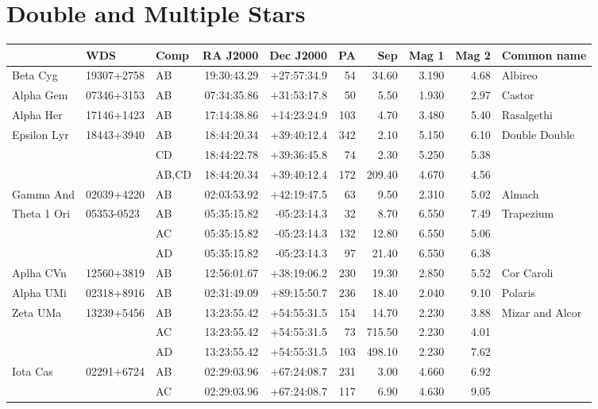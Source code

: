 \documentclass[11pt]{article}
\begin{document}
\section*{Double and Multiple Stars}

\begin{longtable}{lllrrrrrrl}
  \toprule
               & WDS        & Comp  & RA J2000    & Dec J2000   & PA  & Sep    & Mag 1 & Mag 2 & Common name \\
  \midrule \endhead
  Beta Cyg     & 19307+2758 & AB    & 19:30:43.29 & +27:57:34.9 & 54  & 34.60  & 3.190 & 4.68  & Albireo \\[1.5ex]
  Alpha Gem    & 07346+3153 & AB    & 07:34:35.86 & +31:53:17.8 & 50  & 5.50   & 1.930 & 2.97  & Castor \\[1.5ex]
  Alpha Her    & 17146+1423 & AB    & 17:14:38.86 & +14:23:24.9 & 103 & 4.70   & 3.480 & 5.40  & Rasalgethi \\[1.5ex]
  Epsilon Lyr  & 18443+3940 & AB    & 18:44:20.34 & +39:40:12.4 & 342 & 2.10   & 5.150 & 6.10  & Double Double \\
               &            & CD    & 18:44:22.78 & +39:36:45.8 & 74  & 2.30   & 5.250 & 5.38 \\
               &            & AB,CD & 18:44:20.34 & +39:40:12.4 & 172 & 209.40 & 4.670 & 4.56 \\[1.5ex]
  Gamma And    & 02039+4220 & AB    & 02:03:53.92 & +42:19:47.5 & 63  & 9.50   & 2.310 & 5.02  & Almach \\[1.5ex]
  Theta 1 Ori  & 05353-0523 & AB    & 05:35:15.82 & -05:23:14.3 & 32  & 8.70   & 6.550 & 7.49  & Trapezium \\
               &            & AC    & 05:35:15.82 & -05:23:14.3 & 132 & 12.80  & 6.550 & 5.06 \\
               &            & AD    & 05:35:15.82 & -05:23:14.3 & 97  & 21.40  & 6.550 & 6.38 \\[1.5ex]
  Aplha CVn    & 12560+3819 & AB    & 12:56:01.67 & +38:19:06.2 & 230 & 19.30  & 2.850 & 5.52  & Cor Caroli \\[1.5ex]
  Alpha UMi    & 02318+8916 & AB    & 02:31:49.09 & +89:15:50.7 & 236 & 18.40  & 2.040 & 9.10  & Polaris \\[1.5ex]
  Zeta UMa     & 13239+5456 & AB    & 13:23:55.42 & +54:55:31.5 & 154 & 14.70  & 2.230 & 3.88  & Mizar and Alcor \\
               &            & AC    & 13:23:55.42 & +54:55:31.5 & 73  & 715.50 & 2.230 & 4.01  & \\
               &            & AD    & 13:23:55.42 & +54:55:31.5 & 103 & 498.10 & 2.230 & 7.62  & \\[1.5ex]
  Iota Cas     & 02291+6724 & AB    & 02:29:03.96 & +67:24:08.7 & 231 & 3.00   & 4.660 & 6.92  & \\
               &            & AC    & 02:29:03.96 & +67:24:08.7 & 117 & 6.90   & 4.630 & 9.05  & \\
\bottomrule
\end{longtable}



\end{document}
